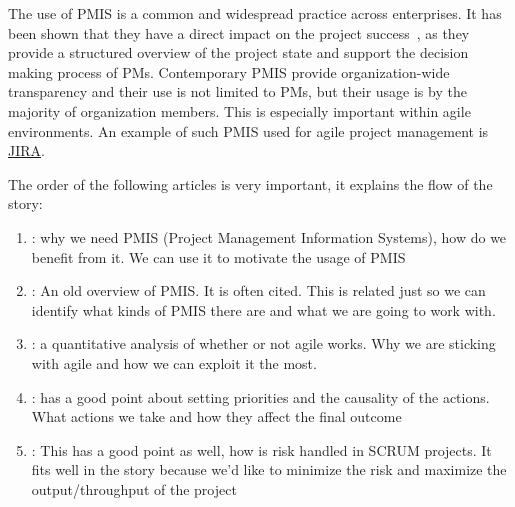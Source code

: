 \documentclass[a4paper, 12pt]{article}
\begin{document}


The use of PMIS is a common and widespread practice across enterprises. It has been shown that they have a direct impact on the project success~\cite{RAYMOND2008213}, as they provide a structured overview of the project state and support the decision making process of PMs. Contemporary PMIS provide organization-wide transparency and their use is not limited to PMs, but their usage is by the majority of organization members. This is especially important within agile~\cite{alliance2001agile} environments. An example of such PMIS used for agile project management is \href{https://www.atlassian.com/software/jira}{JIRA}.

The order of the following articles is very important, it explains the flow of the story:

\begin{enumerate}
	\item \cite{CANIELS2012162}: why we need PMIS  (Project Management Information Systems), how do we benefit from it. We can use it to motivate the usage of PMIS

	\item \cite{RAYMOND2008213}: An old overview of PMIS. It is often cited. This is related just so we can identify what kinds of PMIS there are and what we are going to work with.

	\item \cite{SERRADOR20151040}: a quantitative analysis of whether or not agile works. Why we are sticking with agile and how we can exploit it the most.

	\item \cite{Toole2006APM}: has a good point about setting priorities and the causality of the actions. What actions we take and how they affect the final outcome

	\item \cite{tavares2019risk}: This has a good point as well, how is risk handled in SCRUM projects. It fits well in the story because we'd like to minimize the risk and maximize the output/throughput of the project

\end{enumerate}
\end{document}
